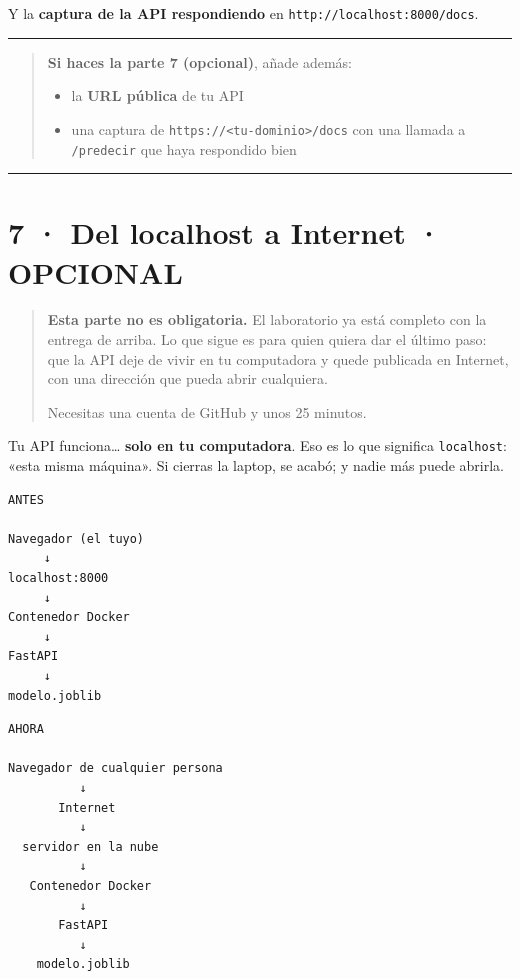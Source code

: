\documentclass[
]{article}
\providecommand{\tightlist}{%
  \setlength{\itemsep}{0pt}\setlength{\parskip}{0pt}}
\begin{document}
Y la \textbf{captura de la API respondiendo} en
\texttt{http://localhost:8000/docs}.

\begin{center}\rule{0.5\linewidth}{0.5pt}\end{center}

\begin{quote}
\textbf{Si haces la parte 7 (opcional)}, añade además:

\begin{itemize}
\tightlist
\item
  la \textbf{URL pública} de tu API
\item
  una captura de
  \texttt{https://\textless{}tu-dominio\textgreater{}/docs} con una
  llamada a \texttt{/predecir} que haya respondido bien
\end{itemize}
\end{quote}

\protect{}\label{amf75WIXnYyc}
\begin{center}\rule{0.5\linewidth}{0.5pt}\end{center}

\section{7 · Del localhost a Internet ·
OPCIONAL}\label{7--del-localhost-a-internet--opcional}

\begin{quote}
\textbf{Esta parte no es obligatoria.} El laboratorio ya está completo
con la entrega de arriba. Lo que sigue es para quien quiera dar el
último paso: que la API deje de vivir en tu computadora y quede
publicada en Internet, con una dirección que pueda abrir cualquiera.

Necesitas una cuenta de GitHub y unos 25 minutos.
\end{quote}

Tu API funciona\ldots{} \textbf{solo en tu computadora}. Eso es lo que
significa \texttt{localhost}: «esta misma máquina». Si cierras la
laptop, se acabó; y nadie más puede abrirla.

\begin{verbatim}
ANTES

Navegador (el tuyo)
     ↓
localhost:8000
     ↓
Contenedor Docker
     ↓
FastAPI
     ↓
modelo.joblib
\end{verbatim}

\begin{verbatim}
AHORA

Navegador de cualquier persona
          ↓
       Internet
          ↓
  servidor en la nube
          ↓
   Contenedor Docker
          ↓
       FastAPI
          ↓
    modelo.joblib
\end{verbatim}
\end{document}
